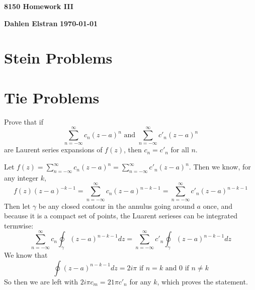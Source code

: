 \documentclass[12pt]{article}
\begin{document}
\begin{newtitle}
  \begin{center}
    \textbf{\Huge 8150 Homework III}
  \end{center}
  \textbf{Dahlen Elstran} \hfill \textbf{\today}
\end{newtitle}

\section*{Stein Problems}

\begin{statement}

\end{statement}


\section*{Tie Problems}

\begin{statement}
  Prove that if 
  $$ \sum^{\infty}_{n=-\infty} c_n(z-a)^n \text{ and } \sum^{\infty}_{n=-\infty} c'_n(z-a)^n $$
  are Laurent series expansions of $f(z)$, then $c_n=c'_n$ for all $n$.
\end{statement}
\begin{newproof}
  Let $f(z)=\sum^{\infty}_{n=-\infty} c_n(z-a)^n=\sum^{\infty}_{n=-\infty} c'_n(z-a)^n$. Then we know, for any integer $k$,  
  \begin{equation*}
    f(z)(z-a)^{-k-1}=\sum^{\infty}_{n=-\infty} c_n(z-a)^{n-k-1}=\sum^{\infty}_{n=-\infty} c'_n(z-a)^{n-k-1}
  \end{equation*}
  Then let $\gamma$ be any closed contour in the annulus going around $a$ once, and because it is a compact set 
  of points, the Luarent serieses can be integrated termwise:
  \begin{equation*}
    \sum^{\infty}_{n=-\infty}c_n \oint_{\gamma} (z-a)^{n-k-1}dz=\sum^{\infty}_{n=-\infty}c'_n \oint_{\gamma} (z-a)^{n-k-1}dz
  \end{equation*}
  We know that 
  \begin{equation*}
    \oint(z-a)^{n-k-1}dz = 2i\pi \text{ if } n=k \text{ and } 0 \text{ if } n \neq k
  \end{equation*}
  So then we are left with $2i\pi c_m = 21\pi c'_n$ for any $k$, which proves the statement.
\end{newproof}
\end{document}
